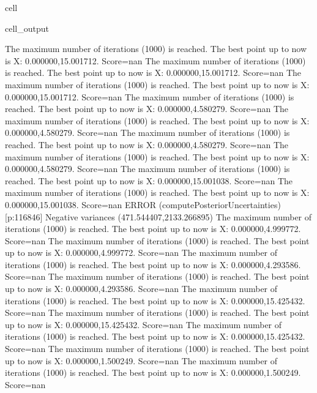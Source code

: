 \documentclass[letterpaper,10pt,english]{jupyterBook}
\begin{document}
\begin{sphinxuseclass}{cell}
\begin{sphinxVerbatimOutput}
\begin{sphinxuseclass}{cell_output}
\begin{sphinxVerbatim}[commandchars=\\\{\}]
The maximum number of iterations (1000) is reached. The best point up to now is X: \PYGZob{}0.000000,15.001712\PYGZcb{}. Score=\PYGZhy{}nan
The maximum number of iterations (1000) is reached. The best point up to now is X: \PYGZob{}0.000000,15.001712\PYGZcb{}. Score=\PYGZhy{}nan
The maximum number of iterations (1000) is reached. The best point up to now is X: \PYGZob{}0.000000,15.001712\PYGZcb{}. Score=\PYGZhy{}nan
The maximum number of iterations (1000) is reached. The best point up to now is X: \PYGZob{}0.000000,4.580279\PYGZcb{}. Score=\PYGZhy{}nan
The maximum number of iterations (1000) is reached. The best point up to now is X: \PYGZob{}0.000000,4.580279\PYGZcb{}. Score=\PYGZhy{}nan
The maximum number of iterations (1000) is reached. The best point up to now is X: \PYGZob{}0.000000,4.580279\PYGZcb{}. Score=\PYGZhy{}nan
The maximum number of iterations (1000) is reached. The best point up to now is X: \PYGZob{}0.000000,4.580279\PYGZcb{}. Score=\PYGZhy{}nan
The maximum number of iterations (1000) is reached. The best point up to now is X: \PYGZob{}0.000000,15.001038\PYGZcb{}. Score=\PYGZhy{}nan
The maximum number of iterations (1000) is reached. The best point up to now is X: \PYGZob{}0.000000,15.001038\PYGZcb{}. Score=\PYGZhy{}nan
ERROR (compute\PYGZus{}Posterior\PYGZus{}Uncertainties) [p:116846] Negative variances (471.544407,\PYGZhy{}2133.266895)
The maximum number of iterations (1000) is reached. The best point up to now is X: \PYGZob{}0.000000,4.999772\PYGZcb{}. Score=\PYGZhy{}nan
The maximum number of iterations (1000) is reached. The best point up to now is X: \PYGZob{}0.000000,4.999772\PYGZcb{}. Score=\PYGZhy{}nan
The maximum number of iterations (1000) is reached. The best point up to now is X: \PYGZob{}0.000000,4.293586\PYGZcb{}. Score=\PYGZhy{}nan
The maximum number of iterations (1000) is reached. The best point up to now is X: \PYGZob{}0.000000,4.293586\PYGZcb{}. Score=\PYGZhy{}nan
The maximum number of iterations (1000) is reached. The best point up to now is X: \PYGZob{}0.000000,\PYGZhy{}15.425432\PYGZcb{}. Score=\PYGZhy{}nan
The maximum number of iterations (1000) is reached. The best point up to now is X: \PYGZob{}0.000000,\PYGZhy{}15.425432\PYGZcb{}. Score=\PYGZhy{}nan
The maximum number of iterations (1000) is reached. The best point up to now is X: \PYGZob{}0.000000,\PYGZhy{}15.425432\PYGZcb{}. Score=\PYGZhy{}nan
The maximum number of iterations (1000) is reached. The best point up to now is X: \PYGZob{}0.000000,1.500249\PYGZcb{}. Score=\PYGZhy{}nan
The maximum number of iterations (1000) is reached. The best point up to now is X: \PYGZob{}0.000000,1.500249\PYGZcb{}. Score=\PYGZhy{}nan

\end{sphinxVerbatim}
\end{sphinxuseclass}
\end{sphinxVerbatimOutput}
\end{sphinxuseclass}
\end{document}
